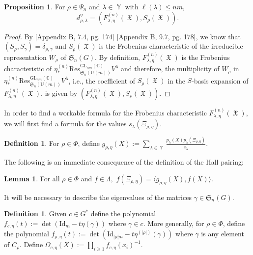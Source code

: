 \documentclass[12pt,reqno]{amsart}
\theoremstyle{definition}
\newtheorem{lem}[thm]{Lemma}
\newtheorem{prop}[thm]{Proposition}
\newtheorem{defn}[thm]{Definition}
\DeclareMathOperator{\Par}{\mathbb{Y}}
\DeclareMathOperator{\fX}{\mathfrak{X}}
\begin{document}
\begin{prop}\label{formula for branching coeff}
For $\rho \in \Psi_n$ and $\lambda \in \Par$ with $\ell(\lambda) \leq nm$,
    $$d_{\rho,\lambda}^{\eta} = \left( F_{\lambda,\eta}^{(n)}(\fX), S_{\rho}(\fX) \right).$$
\end{prop}
\begin{proof}
    By \cite{Macdonald} [Appendix B, 7.4, pg. 174] [Appendix B, 9.7, pg. 178], we know that $(S_{\rho},S_{\gamma}) = \delta_{\rho,\gamma}$ and $S_{\rho}(\fX)$ is the Frobenius characteristic of the irreducible representation $W_{\rho}$ of $\mathfrak{S}_n(G).$ By definition, $F_{\lambda,\eta}^{(n)}(\fX)$ is the Frobenius characteristic of $\eta^{(n)}_*\mathrm{Res}^{\mathrm{GL}_{nm}(\mathbb{C})}_{\mathfrak{S}_n(\mathrm{U}(m))} V^{\lambda}$ and therefore, the multiplicity of $W_{\rho}$ in $\eta^{(n)}_*\mathrm{Res}^{\mathrm{GL}_{nm}(\mathbb{C})}_{\mathfrak{S}_n(\mathrm{U}(m))} V^{\lambda}$, i.e., the coefficient of $S_{\rho}(\fX)$ in the $S$-basis expansion of $F_{\lambda,\eta}^{(n)}(\fX)$, is given by $\left( F_{\lambda,\eta}^{(n)}(\fX), S_{\rho}(\fX) \right).$
\end{proof}

In order to find a workable formula for the Frobenius characteristic $F_{\lambda,\eta}^{(n)}(\fX)$, we will first find a formula for the values $s_{\lambda}(\Xi_{\rho,\eta}).$ 

\begin{defn}
    For $\rho \in \Phi$, define 
    $g_{\rho,\eta}(X):= \sum_{\lambda \in \Par} \frac{p_{\lambda}(X)p_{\lambda}(\Xi_{\rho,\eta})}{z_{\lambda}}.$
\end{defn}

The following is an immediate consequence of the definition of the Hall pairing:

\begin{lem}\label{substitution lem}
For all $\rho \in \Phi$ and $f \in \Lambda,$
    $f(\Xi_{\rho,\eta}) = \langle g_{\rho,\eta}(X), f(X) \rangle .$
\end{lem}

It will be necessary to describe the eigenvalues of the matrices $\gamma \in \mathfrak{S}_n(G).$

\begin{defn}
    Given $c \in G^*$ define the polynomial $f_{c,\eta}(t):=  \det(\mathrm{Id}_{m} - t\eta(\gamma))$ where $\gamma \in c.$ More generally, for $\rho \in \Phi$, define the polynomial $f_{\rho,\eta}(t):= \det\left( \mathrm{Id}_{|\rho|m} - t \eta^{(|\rho|)}(\gamma)  \right)$ where $\gamma$ is any element of $C_{\rho}.$ Define $\Omega_{c,\eta}(X):= \prod_{i\geq 1}f_{c,\eta}(x_i)^{-1}.$
\end{defn}
\end{document}
